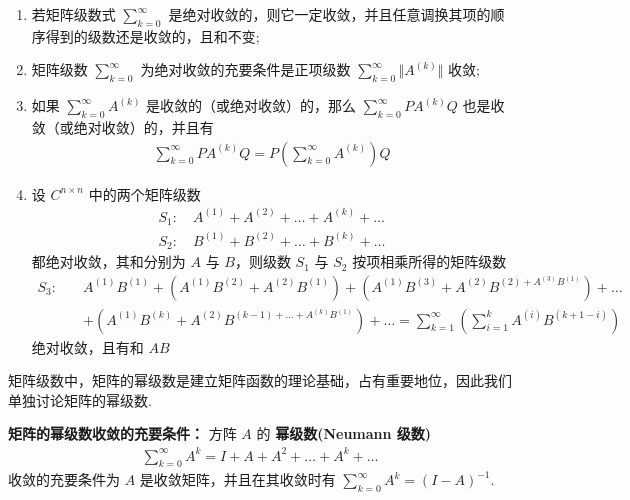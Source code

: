             \begin{enumerate}
                \item 若矩阵级数式 $\sum_{k=0}^{\infty}$ 是绝对收敛的，则它一定收敛，并且任意调换其项的顺序得到的级数还是收敛的，且和不变;
                \item 矩阵级数 $\sum_{k=0}^{\infty}$ 为绝对收敛的充要条件是正项级数 $\sum_{k=0}^{\infty}\Vert A^{(k)} \Vert$ 收敛;
                \item 如果 $\sum_{k=0}^{\infty}A^{(k)}$ 是收敛的（或绝对收敛）的，那么 $\sum_{k=0}^{\infty}PA^{(k)}Q$ 也是收敛（或绝对收敛）的，并且有 
                    \begin{align*}
                        \sum_{k=0}^{\infty}PA^{(k)}Q = P(\sum_{k=0}^{\infty}A^{(k)})Q
                    \end{align*}
                \item 设 $C^{n \times n}$ 中的两个矩阵级数
                    \begin{align*}
                        S_1: \quad A^{(1)} + A^{(2)} + \dots + A^{(k)} + \dots \\
                        S_2: \quad B^{(1)} + B^{(2)} + \dots + B^{(k)} + \dots
                    \end{align*}
                    都绝对收敛，其和分别为 $A$ 与 $B$，则级数 $S_1$ 与 $S_2$ 按项相乘所得的矩阵级数 
                    \begin{align*}
                        S_3: \quad &A^{(1)}B^{(1)} + (A^{(1)}B^{(2)} + A^{(2)}B^{(1)}) + (A^{(1)}B^{(3)} + A^{(2)}B^{(2) + A^{(3)}B^{(1)}}) + \dots \\ &+ (A^{(1)}B^{(k)} + A^{(2)}B^{(k-1) + \dots + A^{(k)}B^{(1)}}) + \dots = \sum_{k=1}^{\infty}(\sum_{i=1}^{k}A^{(i)}B^{(k + 1 - i)})
                    \end{align*}
                    绝对收敛，且有和 $AB$
            \end{enumerate}

            \par 矩阵级数中，矩阵的幂级数是建立矩阵函数的理论基础，占有重要地位，因此我们单独讨论矩阵的幂级数.
            \par \textbf{矩阵的幂级数收敛的充要条件：} 方阵 $A$ 的 \textbf{幂级数(Neumann 级数)}
            \begin{align*}
                \sum_{k=0}^{\infty}A^k = I + A + A^2 + \dots + A^k + \dots
            \end{align*}
            收敛的充要条件为 $A$ 是收敛矩阵，并且在其收敛时有 $\sum_{k=0}^{\infty}A^k = (I - A)^{-1}$.

